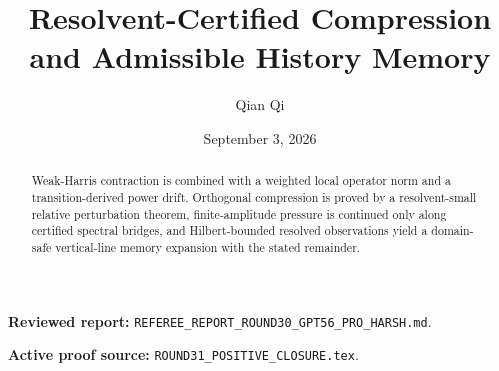 \documentclass[11pt,reqno]{amsart}
\title[A4 Round 31 revision]{Resolvent-Certified Compression and Admissible History Memory}
\author{Qian Qi}
\date{September 3, 2026}
\begin{document}
\begin{abstract}
Weak-Harris contraction is combined with a weighted local operator norm and a transition-derived power drift.  Orthogonal compression is proved by a resolvent-small relative perturbation theorem, finite-amplitude pressure is continued only along certified spectral bridges, and Hilbert-bounded resolved observations yield a domain-safe vertical-line memory expansion with the stated remainder.
\end{abstract}
\maketitle
\noindent\textbf{Reviewed report:} \texttt{REFEREE\_REPORT\_ROUND30\_GPT56\_PRO\_HARSH.md}.\par
\noindent\textbf{Active proof source:} \texttt{ROUND31\_POSITIVE\_CLOSURE.tex}.\par

\end{document}

